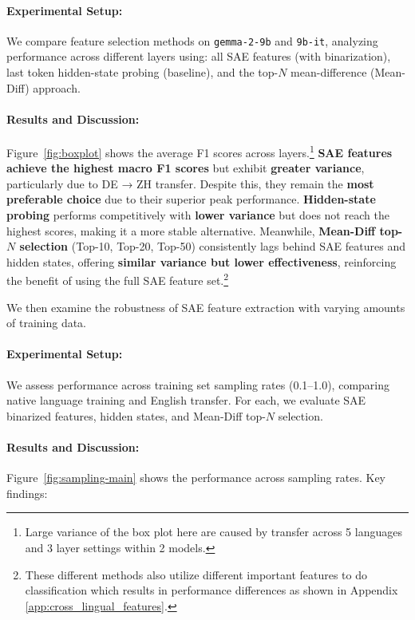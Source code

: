 
\paragraph{Experimental Setup:}
We compare feature selection methods on \texttt{gemma-2-9b} and \texttt{9b-it}, analyzing performance across different layers using: all SAE features (with binarization), last token hidden-state probing (baseline), and the top-$N$ mean-difference (Mean-Diff) approach.

\paragraph{Results and Discussion:}
Figure~\ref{fig:boxplot} shows the average F1 scores across layers.\footnote{Large variance of the box plot here are caused by transfer across 5 languages and 3 layer settings within 2 models.} \textbf{SAE features achieve the highest macro F1 scores} but exhibit \textbf{greater variance}, particularly due to DE → ZH transfer. Despite this, they remain the \textbf{most preferable choice} due to their superior peak performance. \textbf{Hidden-state probing} performs competitively with \textbf{lower variance} but does not reach the highest scores, making it a more stable alternative. Meanwhile, \textbf{Mean-Diff top-$N$ selection} (Top-10, Top-20, Top-50) consistently lags behind SAE features and hidden states, offering \textbf{similar variance but lower effectiveness}, reinforcing the benefit of using the full SAE feature set.\footnote{These different methods also utilize different important features to do classification which results in performance differences as shown in Appendix \ref{app:cross_lingual_features}.}


We then examine the robustness of SAE feature extraction with varying amounts of training data.

\paragraph{Experimental Setup:}
We assess performance across training set sampling rates (0.1–1.0), comparing native language training and English transfer. For each, we evaluate SAE binarized features, hidden states, and Mean-Diff top-$N$ selection.

\paragraph{Results and Discussion:}
Figure~\ref{fig:sampling-main} shows the performance across sampling rates. Key findings:

